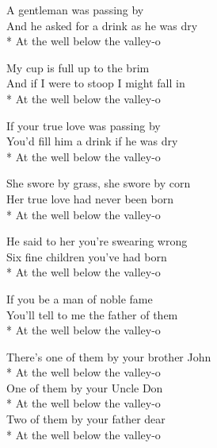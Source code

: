 


\contd
{}

\versemark
A gentleman was passing by\\
And he asked for a drink as he was dry\\*
\vin At the well below the valley-o

\versemark
My cup is full up to the brim\\
And if I were to stoop I might fall in\\*
\vin At the well below the valley-o

\versemark
If your true love was passing by\\
You’d fill him a drink if he was dry\\*
\vin At the well below the valley-o

\versemark
She swore by grass, she swore by corn\\
Her true love had never been born\\*
\vin At the well below the valley-o

\versemark
He said to her you’re swearing wrong\\
Six fine children you’ve had born\\*
\vin At the well below the valley-o

\versemark
If you be a man of noble fame\\
You’ll tell to me the father of them\\*
\vin At the well below the valley-o

\versemark
There’s one of them by your brother John\\*
\vin At the well below the valley-o\\
One of them by your Uncle Don\\*
\vin At the well below the valley-o\\
Two of them by your father dear\\*
\vin At the well below the valley-o

